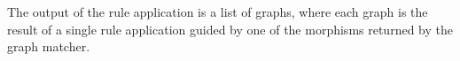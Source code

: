 The output of the rule application is a list of graphs, where each graph is the result of a single rule application guided by one of the morphisms returned by the graph matcher.








